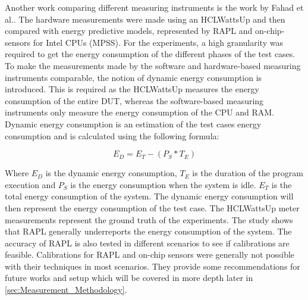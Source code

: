 Another work comparing different measuring instruments is the work by Fahad et al.\cite{fahad2019comparative}. The hardware measurements were made using an HCLWattsUp and then compared with energy predictive models, represented by RAPL and on-chip-sensors for Intel CPUs (MPSS). For the experiments, a high granularity was required to get the energy consumption of the different phases of the test cases. To make the measurements made by the software and hardware-based measuring instruments comparable, the notion of dynamic energy consumption is introduced. This is required as the HCLWattsUp measures the energy consumption of the entire DUT, whereas the software-based measuring instruments only measure the energy consumption of the CPU and RAM. Dynamic energy consumption is an estimation of the test cases energy consumption and is calculated using the following formula:\cite{fahad2019comparative}

\begin{equation}\label{eq:dynamicEnergy}
    E_D = E_T - (P_S * T_E)
\end{equation}

Where $E_D$ is the dynamic energy consumption, $T_E$ is the duration of the program execution and $P_S$ is the energy consumption when the system is idle. $E_T$ is the total energy consumption of the system. The dynamic energy consumption will then represent the energy consumption of the test case. The HCLWattsUp meter measurements represent the ground truth of the experiments. The study shows that RAPL generally underreports the energy consumption of the system. The accuracy of RAPL is also tested in different scenarios to see if calibrations are feasible. Calibrations for RAPL and on-chip sensors were generally not possible with their techniques in most scenarios. They provide some recommendations for future works and setup which will be covered in more depth later in \cref{sec:Measurement_Methodology}.